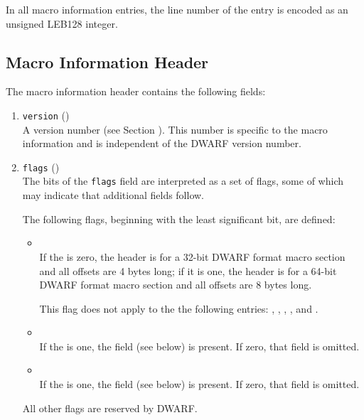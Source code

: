 In all macro information entries,
the line number of the entry is encoded as an
unsigned LEB128 integer.

\subsection{Macro Information Header}
The macro information header contains the following fields:

\begin{enumerate}[1. ]
\item \texttt{version} (\HFTuhalf) \\
A version number (see Section ).
This number is specific to the macro information and is independent
of the DWARF version number.

\item \texttt{flags} (\HFTubyte) \\
The bits of the \texttt{flags} field are interpreted as a set
of flags, some of which may indicate that additional fields follow.

The following flags, beginning with the least significant bit, are defined:
\begin{itemize}
\item \HFNoffsetsizeflag \\
If the \HFNoffsetsizeflag{} is zero, the header is for a 32-bit 
DWARF format macro section and all offsets are 4 bytes long;
if it is one, the header is for a 64-bit DWARF format macro section 
and all offsets are 8 bytes long.

\bb
This flag does not apply to the the following entries:
\DWMACROdefinesupfour,
\DWMACROdefinesupeight,
\DWMACROundefsupfour,
\DWMACROundefsupeight,
\DWMACROimportsupfour{} and
\DWMACROimportsupeight.
\eb

\item {} \\
If the  is one, 
the  field (see below) is present. 
If zero, that field is omitted.

\item {} \\
If the  is one,
the  field (see below) is present.
If zero, that field is omitted.

\end{itemize}
All other flags are reserved by DWARF.


\end{enumerate}
